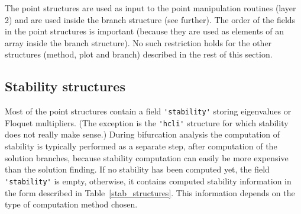 \documentclass[10pt]{scrartcl}
\newcommand{\blist}[1]{\mbox{\lstinline!#1!}}
\begin{document}
The point structures are used as input to the point
manipulation routines (layer 2) and are used inside
the branch structure (see further). The order of the fields in the point 
structures is important (because they are used as elements
of an array inside the branch structure).
No such restriction holds for the other structures (method, plot and
branch) described in the rest of this section.

\subsection{Stability structures}\label{sec:stab:struct}

Most of the point structures contain a 
field \blist{'stability'} storing eigenvalues or Floquet multipliers. (The exception is  
the \blist{'hcli'} structure for which stability does not really make
sense.) During bifurcation analysis the computation of stability is
typically performed as a separate step, after computation of the
solution branches, because stability computation can easily be more
expensive than the solution finding. If no stability has been computed
yet, the field \blist{'stability'} is empty, otherwise, it contains
computed stability information in the form described in
Table~\ref{stab_structures}. This information depends on the type of
computation method chosen.
\end{document}
